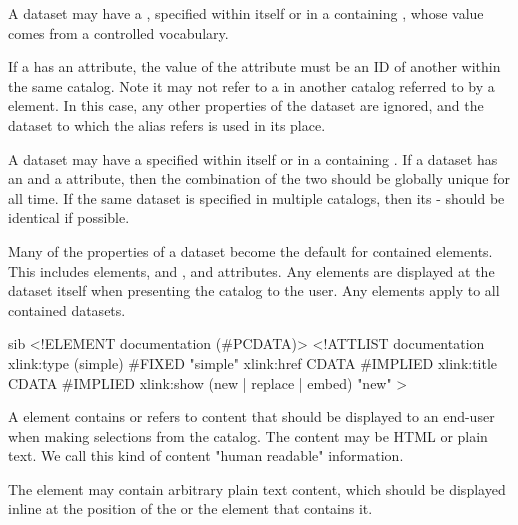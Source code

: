 A dataset may have a , specified within itself or in a
containing , whose value comes from a controlled
vocabulary.

If a  has an  attribute, the value of the
attribute must be an ID of another  within the same
catalog. Note it may not refer to a  in another
catalog referred to by a  element. In this case,
any other properties of the dataset are ignored, and the dataset to
which the alias refers is used in its place.

A dataset may have a  specified within itself or in a
containing .  If a dataset has an  and a
 attribute, then the combination of the two should be
globally unique for all time. If the same dataset is specified in
multiple catalogs, then its  -  should be
identical if possible.

Many of the properties of a dataset become the default for contained
 elements.  This includes  elements, and
,  and  attributes. Any
 elements are displayed at the dataset itself
when presenting the catalog to the user. Any 
elements apply to all contained datasets.

 

\begin{vcode}{sib}
<!ELEMENT documentation (#PCDATA)>
<!ATTLIST documentation
    xlink:type (simple) #FIXED "simple"
    xlink:href CDATA #IMPLIED
    xlink:title CDATA #IMPLIED
    xlink:show (new | replace | embed) "new"
>
\end{vcode}

A  element contains or refers to content that
should be displayed to an end-user when making selections from the
catalog. The content may be HTML or plain text. We call this kind of
content "human readable" information.

The  element may contain arbitrary plain text
content, which should be displayed inline at the position of the
 or the  element that contains
it.

